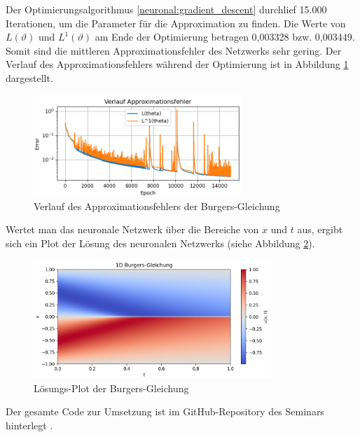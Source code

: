 Der Optimierungsalgorithmus \ref{neuronal:gradient_descent} durchlief 15.000 Iterationen, um die Parameter für die Approximation zu finden.
Die Werte von \( L(\vartheta) \) und \( L^1(\vartheta) \) am Ende der Optimierung betragen 0,003328 bzw. 0,003449.
Somit sind die mittleren Approximationsfehler des Netzwerks sehr gering.
Der Verlauf des Approximationsfehlers während der Optimierung ist in Abbildung \ref{fig:fehler_burgers} dargestellt.

\begin{figure}
    \centering
    \hspace*{-0.1\textwidth}
    \includegraphics[width=0.7\textwidth]{papers/neuronal/images/approximation_error_burgers.png}
    \caption{Verlauf des Approximationsfehlers der Burgers-Gleichung}
    \label{fig:fehler_burgers}
\end{figure}

Wertet man das neuronale Netzwerk über die Bereiche von \( x \) und \( t \) aus, ergibt sich ein Plot der Lösung des neuronalen Netzwerks (siehe Abbildung \ref{fig:loesung_burgers}).

\begin{figure}
    \centering
    \includegraphics[width=0.8\textwidth]{papers/neuronal/images/prediction_burgers_net.png}
    \caption{Lösungs-Plot der Burgers-Gleichung}
    \label{fig:loesung_burgers}
\end{figure}

Der gesamte Code zur Umsetzung ist im GitHub-Repository des Seminars hinterlegt \cite{neuronal:github_source_code}.


